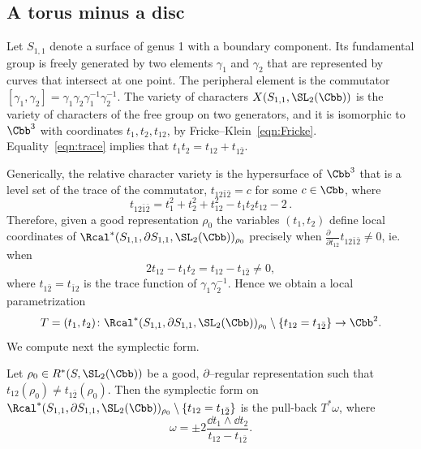 \subsection{A torus minus a disc}

Let $S_{1,1}$ denote a surface of genus 1 with a boundary component. Its fundamental group is freely generated by two elements $\gamma_1$ and $\gamma_2$ that are represented by curves that intersect at one point. The peripheral element is the commutator $[\gamma_1,\gamma_2]=\gamma_1\gamma_2\gamma_1^{-1}\gamma_2^{-1}$. The variety of characters $X(S_{1,1},\SL_2(\Cbb))$ is the variety of characters of the free group on two generators, and it is isomorphic to $\Cbb^3$ with coordinates $t_1,t_2,t_{12}$, by Fricke--Klein~\eqref{eqn:Fricke}. Equality~\eqref{eqn:trace} implies that $t_1t_2 = t_{12}+t_{1\bar2}$.



Generically, the relative character variety is the hypersurface of $\Cbb^3$ that is a level set of the trace of the commutator, $t_{12\bar 1\bar2}= c$ for some $c\in\Cbb$, where
\begin{equation}\label{eqn:commutator}
t_{12\bar 1\bar2} =t_1^2+t_2^2+t_{12}^2 - t_1t_2t_{12}-2 \,.
\end{equation}
Therefore, given a good representation $\rho_0$ the variables $(t_1,t_2)$ define local coordinates of $\Rcal^*(S_{1,1},\partial S_{1,1}, \SL_2(\Cbb))_{\rho_0}$ precisely when $\frac{\partial \phantom {t_{12}}}{\partial {t_{12}} } t_{12\bar 1\bar2} \neq 0$, ie. when
\begin{equation}\label{eqn:t1t2coordinates}
2 t_{12}-t_1 t_2=t_{12}-t_{1\bar 2}\neq 0,
\end{equation}
where $t_{1\bar 2}=t_{\bar 1 2}$ is the trace function of $\gamma_1\gamma_2^{-1}$. Hence we obtain a local parametrization
\[
T=(t_1,t_2)\colon \Rcal^*(S_{1,1},\partial S_{1,1}, \SL_2(\Cbb))_{\rho_0}\setminus\{t_{12}= t_{1\bar 2}\}\to\Cbb^2.
\]
We compute next the symplectic form.

\begin{prop}\label{Prop:symplectic11}
Let $\rho_0 \in R^*(S, \SL_2(\Cbb))$ be a good, $\partial$--regular representation such that $t_{12}(\rho_0)\neq t_{1\bar 2}(\rho_0)$. Then the symplectic form on $\Rcal^*(S_{1,1},\partial S_{1,1}, \SL_2(\Cbb))_{\rho_0}\setminus\{t_{12}= t_{1\bar 2}\}$ is the pull-back $T^*\omega$, where
\[
\omega=\pm 2 \frac{\dd t_1\wedge \dd t_2}{t_{12}- t_{1\bar 2}}.
\]
\end{prop}



